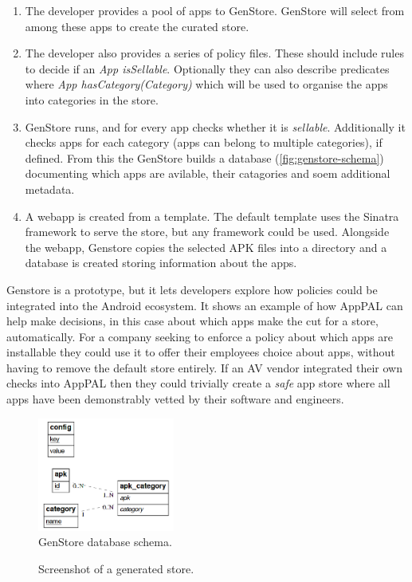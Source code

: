 \documentclass[thesis.tex]{subfiles}
\begin{document}
\begin{enumerate}
\item The developer provides a pool of apps to GenStore. GenStore will select from among these apps to create the curated store.
\item The developer also provides a series of policy files. These should include rules to decide if an \emph{App isSellable}.  Optionally they can also describe predicates where \emph{App hasCategory(Category)} which will be used to organise the apps into categories in the store.
\item GenStore runs, and for every app checks whether it is \emph{sellable}.  Additionally it checks apps for each category (apps can belong to multiple categories), if defined.
  From this the GenStore builds a database (\autoref{fig:genstore-schema}) documenting which apps are avilable, their catagories and soem additional metadata.
\item A webapp is created from a template.  The default template uses the Sinatra framework to serve the store, but any framework could be used.  Alongside the webapp, Genstore copies the selected APK files into a directory and a database is created storing information about the apps.
\end{enumerate}

Genstore is a prototype, but it lets developers explore how policies could be integrated into the Android ecosystem.
It shows an example of how AppPAL can help make decisions, in this case about which apps make the cut for a store, automatically.
For a company seeking to enforce a policy about which apps are installable they could use it to offer their employees choice about apps, without having to remove the default store entirely.
If an AV vendor integrated their own checks into AppPAL then they could trivially create a \emph{safe} app store where all apps have been demonstrably vetted by their software and engineers.

\begin{figure}\centering
  \includegraphics[width=0.4\textwidth]{figures/genstore-schema.png}
  \caption{GenStore database schema.}
  \label{fig:genstore-schema}
\end{figure}

\begin{figure}\centering
  \caption{Screenshot of a generated store.}
  \label{fig:genstore-screenshot}
\end{figure}
\end{document}
